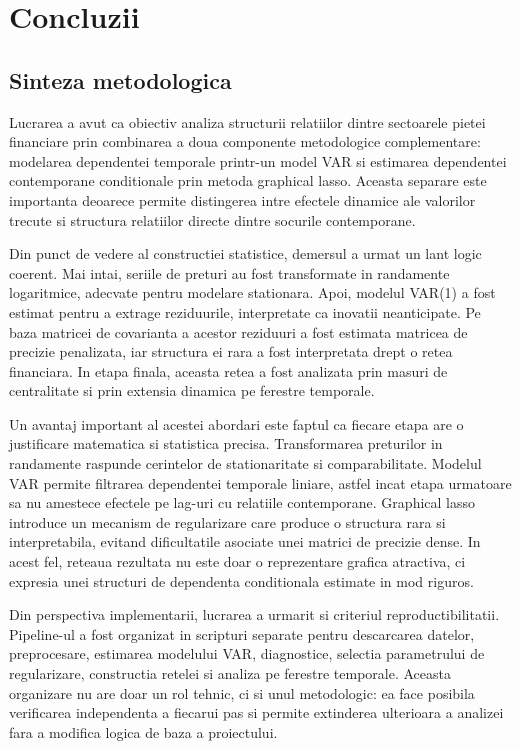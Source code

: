 \chapter{Concluzii}

\section{Sinteza metodologica}

Lucrarea a avut ca obiectiv analiza structurii relatiilor dintre sectoarele
pietei financiare prin combinarea a doua componente metodologice complementare:
modelarea dependentei temporale printr-un model VAR si estimarea dependentei
contemporane conditionale prin metoda graphical lasso. Aceasta separare este
importanta deoarece permite distingerea intre efectele dinamice ale valorilor
trecute si structura relatiilor directe dintre socurile contemporane.

Din punct de vedere al constructiei statistice, demersul a urmat un lant logic
coerent. Mai intai, seriile de preturi au fost transformate in randamente
logaritmice, adecvate pentru modelare stationara. Apoi, modelul VAR(1) a fost
estimat pentru a extrage reziduurile, interpretate ca inovatii neanticipate.
Pe baza matricei de covarianta a acestor reziduuri a fost estimata matricea
de precizie penalizata, iar structura ei rara a fost interpretata drept o
retea financiara. In etapa finala, aceasta retea a fost analizata prin masuri
de centralitate si prin extensia dinamica pe ferestre temporale.

Un avantaj important al acestei abordari este faptul ca fiecare etapa are o
justificare matematica si statistica precisa. Transformarea preturilor in
randamente raspunde cerintelor de stationaritate si comparabilitate. Modelul
VAR permite filtrarea dependentei temporale liniare, astfel incat etapa
urmatoare sa nu amestece efectele pe lag-uri cu relatiile contemporane.
Graphical lasso introduce un mecanism de regularizare care produce o structura
rara si interpretabila, evitand dificultatile asociate unei matrici de precizie
dense. In acest fel, reteaua rezultata nu este doar o reprezentare grafica
atractiva, ci expresia unei structuri de dependenta conditionala estimate in
mod riguros.

Din perspectiva implementarii, lucrarea a urmarit si criteriul reproductibilitatii.
Pipeline-ul a fost organizat in scripturi separate pentru descarcarea datelor,
preprocesare, estimarea modelului VAR, diagnostice, selectia parametrului de
regularizare, constructia retelei si analiza pe ferestre temporale. Aceasta
organizare nu are doar un rol tehnic, ci si unul metodologic: ea face posibila
verificarea independenta a fiecarui pas si permite extinderea ulterioara a
analizei fara a modifica logica de baza a proiectului.

